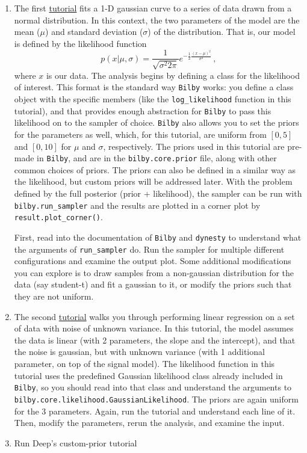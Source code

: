 \documentclass[
    aps,
    10pt,
    prd,
    notitlepage,
    onecolumn,s
    tightenlines,
    nofootinbib]{revtex4-1}
\newcommand{\software}[1]{\texttt{#1}}
\begin{document}
\begin{enumerate}
\item The first \href{https://git.ligo.org/lscsoft/bilby/-/blob/master/examples/core_examples/gaussian_example.py}{tutorial} fits a 1-D gaussian curve to a series of data drawn from a normal distribution. 
In this context, the two parameters of the model are the mean ($\mu$) and standard deviation ($\sigma$) of the distribution.
That is, our model is defined by the likelihood function
\begin{equation}
p( x | \mu, \sigma) = \frac{1}{\sqrt{\sigma^2 2 \pi}} e^{-\frac{1}{2} \frac{ (x - \mu)^2}{\sigma^2}}\,,
\end{equation}
where $x$ is our data.
The analysis begins by defining a class for the likelihood of interest. 
This format is the standard way \software{Bilby} works: you define a class object with the specific members (like the \software{log\_likelihood} function in this tutorial), and that provides enough abstraction for \software{Bilby} to pass this likelihood on to the sampler of choice.
\software{Bilby} also allows you to set the priors for the parameters as well, which, for this tutorial, are uniform from $[0,5]$ and $[0,10]$ for $\mu$ and $\sigma$, respectively.
The priors used in this tutorial are pre-made in \software{Bilby}, and are in the \software{bilby.core.prior} file, along with other common choices of priors.
The priors can also be defined in a similar way as the likelihood, but custom priors will be addressed later.
With the problem defined by the full posterior (prior + likelihood), the sampler can be run with \software{bilby.run\_sampler} and the results are plotted in a corner plot by \software{result.plot\_corner()}.

First, read into the documentation of \software{Bilby} and \software{dynesty} to understand what the arguments of \software{run\_sampler} do. 
Run the sampler for multiple different configurations and examine the output plot. 
Some additional modifications you can explore is to draw samples from a non-gaussian distribution for the data (say student-t) and fit a gaussian to it, or modify the priors such that they are not uniform.
\item The second \href{https://git.ligo.org/lscsoft/bilby/-/blob/master/examples/core_examples/linear_regression_unknown_noise.py}{tutorial} walks you through performing linear regression on a set of data with noise of unknown variance.
In this tutorial, the model assumes the data is linear (with 2 parameters, the slope and the intercept), and that the noise is gaussian, but with unknown variance (with 1 additional parameter, on top of the signal model).
The likelihood function in this tutorial uses the predefined Gaussian likelihood class already included in \software{Bilby}, so you should read into that class and understand the arguments to \software{bilby.core.likelihood.GaussianLikelihood}.
The priors are again uniform for the 3 parameters.
Again, run the tutorial and understand each line of it. 
Then, modify the parameters, rerun the analysis, and examine the input.
\item Run Deep's custom-prior tutorial
\end{enumerate}
\end{document}

